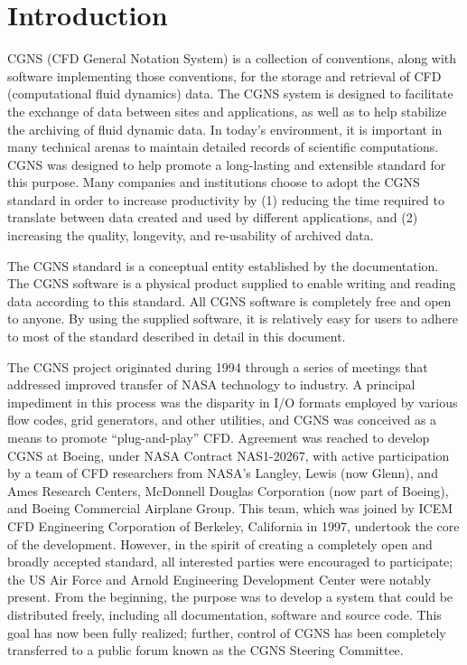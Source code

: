 \section{Introduction}
\thispagestyle{plain}

CGNS (CFD General Notation System) is a collection of conventions,
along with software implementing those conventions, for the storage and
retrieval of CFD (computational fluid dynamics) data.
The CGNS system is designed to facilitate the exchange of data between
sites and applications, as well as to help stabilize the archiving of
fluid dynamic data.
In today's environment, it is important in many technical arenas to
maintain detailed records of scientific computations.
CGNS was designed to help promote a long-lasting and extensible standard
for this purpose.
Many companies and institutions choose to adopt the CGNS standard in
order to increase productivity by (1) reducing the time required to
translate between data created and used by different applications, and
(2) increasing the quality, longevity, and re-usability of archived
data.

The CGNS standard is a conceptual entity established by the
documentation.
The CGNS software is a physical product supplied to enable writing and
reading data according to this standard.
All CGNS software is completely free and open to anyone.
By using the supplied software, it is relatively easy for users to
adhere to most of the standard described in detail in this document.

The CGNS project originated during 1994
through a series of meetings that addressed improved transfer of NASA
technology to industry. A principal impediment in this process was
the disparity in I/O formats employed by various flow codes, grid
generators, and other utilities, and CGNS was conceived as a means to
promote ``plug-and-play'' CFD.  Agreement was reached to develop CGNS
at Boeing, under NASA Contract NAS1-20267, with active participation
by a team of CFD researchers from NASA's Langley, Lewis (now Glenn),
and Ames Research Centers, McDonnell Douglas Corporation (now part of
Boeing), and Boeing Commercial Airplane Group.  This team, which was
joined by ICEM CFD Engineering Corporation of Berkeley, California in
1997, undertook the core of the development. However, in the spirit of
creating a completely open and broadly accepted standard, all interested
parties were encouraged to participate; the US Air Force and Arnold
Engineering Development Center were notably present. From the beginning,
the purpose was to develop a system that could be distributed freely,
including all documentation, software and source code. This goal has now
been fully realized; further, control of CGNS has
been completely transferred to a public forum known as the CGNS Steering
Committee.

